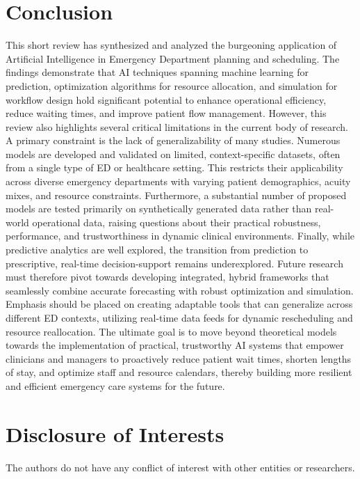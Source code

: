 \documentclass[runningheads]{llncs}
\begin{document}
\section{Conclusion}
This short review has synthesized and analyzed the burgeoning application of Artificial Intelligence in Emergency Department planning and scheduling. The findings demonstrate that AI techniques spanning machine learning for prediction, optimization algorithms for resource allocation, and simulation for workflow design hold significant potential to enhance operational efficiency, reduce waiting times, and improve patient flow management.
However, this review also highlights several critical limitations in the current body of research. A primary constraint is the lack of generalizability of many studies. Numerous models are developed and validated on limited, context-specific datasets, often from a single type of ED or healthcare setting. This restricts their applicability across diverse emergency departments with varying patient demographics, acuity mixes, and resource constraints. Furthermore, a substantial number of proposed models are tested primarily on synthetically generated data rather than real-world operational data, raising questions about their practical robustness, performance, and trustworthiness in dynamic clinical environments.
Finally, while predictive analytics are well explored, the transition from prediction to prescriptive, real-time decision-support remains underexplored. Future research must therefore pivot towards developing integrated, hybrid frameworks that seamlessly combine accurate forecasting with robust optimization and simulation. Emphasis should be placed on creating adaptable tools that can generalize across different ED contexts, utilizing real-time data feeds for dynamic rescheduling and resource reallocation. The ultimate goal is to move beyond theoretical models towards the implementation of practical, trustworthy AI systems that empower clinicians and managers to proactively reduce patient wait times, shorten lengths of stay, and optimize staff and resource calendars, thereby building more resilient and efficient emergency care systems for the future.

\section*{Disclosure of Interests}
\begin{normalsize}
The authors do not have any conflict of interest with other entities or researchers.
\end{normalsize}



\end{document}
